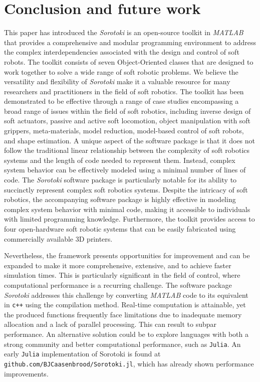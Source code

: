 
\section{Conclusion and future work}
\label{sec:C5:conclusion}
This paper has introduced the \textit{Sorotoki} is an open-source toolkit in \textit{MATLAB} that provides a comprehensive and modular programming environment to address the complex interdependencies associated with the design and control of soft robots. The toolkit consists of seven Object-Oriented classes that are designed to work together to solve a wide range of soft robotic problems. We believe the versatility and flexibility of \textit{Sorotoki} make it a valuable resource for many researchers and practitioners in the field of soft robotics. The toolkit has been demonstrated to be effective through a range of case studies encompassing a broad range of issues within the field of soft robotics, including inverse design of soft actuators, passive and active soft locomotion, object manipulation with soft grippers, meta-materials, model reduction, model-based control of soft robots, and shape estimation. A unique aspect of the software package is that it does not follow the traditional linear relationship between the complexity of soft robotics systems and the length of code needed to represent them. Instead, complex system behavior can be effectively modeled using a minimal number of lines of code. The \textit{Sorotoki} software package is particularly notable for its ability to succinctly represent complex soft robotics systems. Despite the intricacy of soft robotics, the accompanying software package is highly effective in modeling complex system behavior with minimal code, making it accessible to individuals with limited programming knowledge. Furthermore, the toolkit provides access to four open-hardware soft robotic systems that can be easily fabricated using commercially available 3D printers.

Nevertheless, the framework presents opportunities for improvement and can be expanded to make it more comprehensive, extensive, and to achieve faster simulation times. This is particularly significant in the field of control, where computational performance is a recurring challenge. The software package \textit{Sorotoki} addresses this challenge by converting \textit{MATLAB} code to its equivalent in \texttt{c++} using the compilation method. Real-time computation is attainable, yet the produced  functions frequently face limitations due to inadequate memory allocation and a lack of parallel processing. This can result to subpar performance. An alternative solution could be to explore languages with both a strong community and better computational performance, such as \texttt{Julia}. An early \texttt{Julia} implementation of Sorotoki is found at \texttt{github.com/BJCaasenbrood/Sorotoki.jl}, which has already shown performance improvements.

